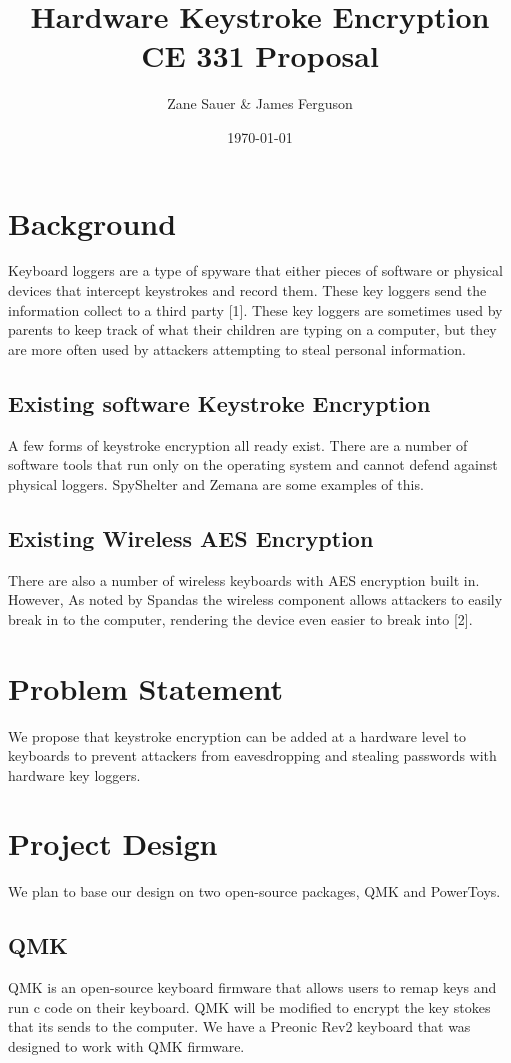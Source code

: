 \documentclass{article}
\title{Hardware Keystroke Encryption \\ CE 331 Proposal}
\author{Zane Sauer \&  James Ferguson}
\date{\today}
\begin{document}
\maketitle

\section{Background}
Keyboard loggers are a type of spyware that either pieces of software or physical devices that intercept keystrokes and record them. These key loggers send the information collect to a third party [1]. These key loggers are sometimes used by parents to keep track of what their children are typing on a computer, but they are more often used by attackers attempting to steal personal information. 

\subsection{Existing software Keystroke Encryption}
A few forms of keystroke encryption all ready exist. There are a number of software tools that run only on the operating system and cannot defend against physical loggers. SpyShelter and Zemana are some examples of this. \\

\subsection{Existing Wireless AES Encryption}
There are also a number of wireless keyboards with AES encryption built in. However, As noted by Spandas the wireless component allows attackers to easily break in to the computer, rendering the device even easier to break into [2].

\section{Problem Statement}
We propose that keystroke encryption can be added at a hardware level to keyboards to prevent attackers from eavesdropping and stealing passwords with hardware key loggers.

\section{Project Design}
We plan to base our design on two open-source packages, QMK and PowerToys.

\subsection{QMK}
QMK is an open-source keyboard firmware that allows users to remap keys and run c code on their keyboard. QMK will be modified to encrypt the key stokes that its sends to the computer. We have a Preonic Rev2 keyboard that was designed to work with QMK firmware.
\end{document}
